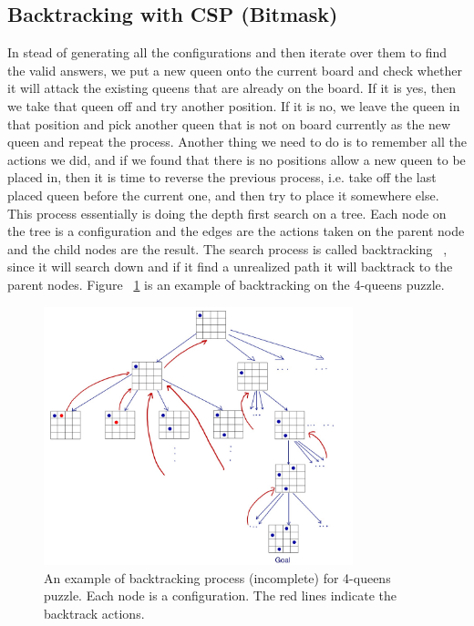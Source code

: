 \subsection{Backtracking with CSP (Bitmask)}\label{sec:csp}
In stead of generating all the configurations and then iterate over them to find the valid answers, we put a new queen onto the current board and check whether it will attack the existing queens that are already on the board. If it is yes, then we take that queen off and try another position. If it is no, we leave the queen in that position and pick another queen that is not on board currently as the new queen and repeat the process. Another thing we need to do is to remember all the actions we did, and if we found that there is no positions allow a new queen to be placed in, then it is time to reverse the previous process, i.e. take off the last placed queen before the current one, and then try to place it somewhere else. This process essentially is doing the depth first search on a tree. Each node on the tree is a configuration and the edges are the actions taken on the parent node and the child nodes are the result. The search process is called backtracking ~\cite{russell_modern_1995}, since it will search down and if it find a unrealized path it will backtrack to the parent nodes. Figure ~\ref{fig:backtrack4Queens} is an example of backtracking on the 4-queens puzzle.
\begin{figure}[ht]
  \centering
  \includegraphics[width=0.8\textwidth]{figure/backtracking4Queens.JPG}
  \caption{An example of backtracking process (incomplete) for 4-queens puzzle. Each node is a configuration. The red lines indicate the backtrack actions.}
  \label{fig:backtrack4Queens}
\end{figure}


